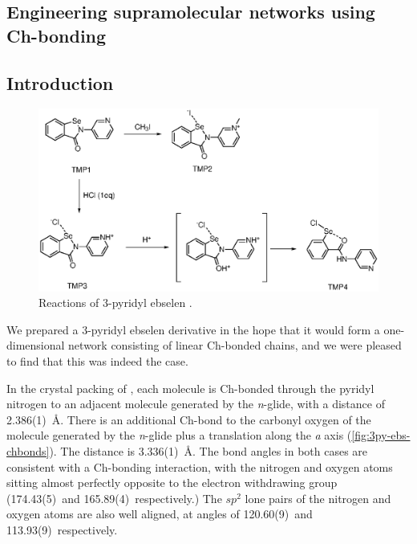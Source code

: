 \begin{refsection}

    \chapter{Engineering supramolecular networks using Ch-bonding}
    
    \section{Introduction}
    
    \begin{figure}
        \centering
        \includegraphics[scale=0.74]{Figures/ebs-3py-scheme.eps}
        \caption{Reactions of 3-pyridyl ebselen .}
        \label{sch:selenylchloride-mechanism}
    \end{figure}
    
    We prepared a 3-pyridyl ebselen derivative  in the hope that it would form a one-dimensional network consisting of linear Ch-bonded chains, and we were pleased to find that this was indeed the case.\autocite{???}
    
    In the crystal packing of , each molecule is Ch-bonded through the pyridyl nitrogen to an adjacent molecule generated by the \textit{n}-glide, with a  distance of 2.386(1)~\AA.
    There is an additional Ch-bond to the carbonyl oxygen of the molecule generated by the \textit{n}-glide plus a translation along the \textit{a} axis (\cref{fig:3py-ebs-chbonds}).
    The  distance is 3.336(1)~\AA.
    The bond angles in both cases are consistent with a Ch-bonding interaction, with the nitrogen and oxygen atoms sitting almost perfectly opposite to the electron withdrawing group (174.43(5)\degree~and 165.89(4)\degree~respectively.)
    The $sp^2$ lone pairs of the nitrogen and oxygen atoms are also well aligned, at angles of 120.60(9)\degree~and 113.93(9)\degree~respectively.
    

\end{refsection}
